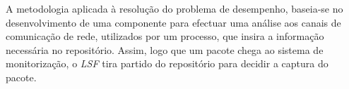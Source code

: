 







%
%


A metodologia aplicada à resolução do problema de desempenho, baseia-se no desenvolvimento de uma componente para efectuar uma análise aos canais de comunicação de rede, utilizados por um processo, que insira a informação necessária no repositório.
Assim, logo que um pacote chega ao sistema de monitorização, o \textit{LSF} tira partido do repositório para decidir a captura do pacote.


